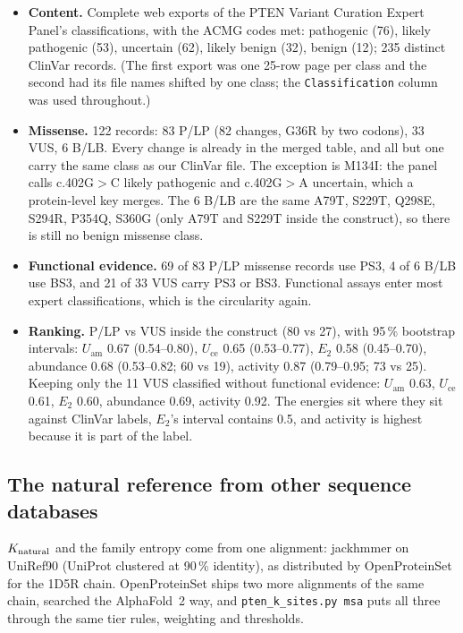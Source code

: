 \documentclass[11pt,a4paper]{article}
\newcommand{\file}[1]{\texttt{#1}}
\newcommand{\Uam}{U_{\mathrm{am}}}
\newcommand{\Uce}{U_{\mathrm{ce}}}
\newcommand{\Etwo}{E_{2}}
\begin{document}
\begin{itemize}
\item \textbf{Content.} Complete web exports of the PTEN Variant Curation
  Expert Panel's classifications, with the ACMG codes met: pathogenic (76),
  likely pathogenic (53), uncertain (62), likely benign (32), benign (12);
  235 distinct ClinVar records. (The first export was one 25-row page per
  class and the second had its file names shifted by one class; the
  \texttt{Classification} column was used throughout.)
\item \textbf{Missense.} 122 records: 83 P/LP (82 changes, G36R by two
  codons), 33 VUS, 6 B/LB. Every change is already in the merged table, and
  all but one carry the same class as our ClinVar file. The exception is
  M134I: the panel calls c.402G$>$C likely pathogenic and c.402G$>$A
  uncertain, which a protein-level key merges. The 6 B/LB are the same A79T,
  S229T, Q298E, S294R, P354Q, S360G (only A79T and S229T inside the
  construct), so there is still no benign missense class.
\item \textbf{Functional evidence.} 69 of 83 P/LP missense records use PS3,
  4 of 6 B/LB use BS3, and 21 of 33 VUS carry PS3 or BS3. Functional assays
  enter most expert classifications, which is the circularity again.
\item \textbf{Ranking.} P/LP vs VUS inside the construct (80 vs 27), with
  95\,\% bootstrap intervals: $\Uam$ 0.67 (0.54--0.80), $\Uce$ 0.65
  (0.53--0.77), $\Etwo$ 0.58 (0.45--0.70), abundance 0.68 (0.53--0.82; 60 vs
  19), activity 0.87 (0.79--0.95; 73 vs 25). Keeping only the 11 VUS
  classified without functional evidence: $\Uam$ 0.63, $\Uce$ 0.61, $\Etwo$
  0.60, abundance 0.69, activity 0.92. The energies sit where they sit
  against ClinVar labels, $\Etwo$'s interval contains 0.5, and activity is
  highest because it is part of the label.
\end{itemize}

\subsection{The natural reference from other sequence databases}\label{sec:msa}

$K_{\rm natural}$ and the family entropy come from one alignment: jackhmmer on
UniRef90 (UniProt clustered at 90\,\% identity), as distributed by
OpenProteinSet for the 1D5R chain. OpenProteinSet ships two more alignments of
the same chain, searched the AlphaFold~2 way, and \file{pten\_k\_sites.py msa}
puts all three through the same tier rules, weighting and thresholds.
\end{document}
